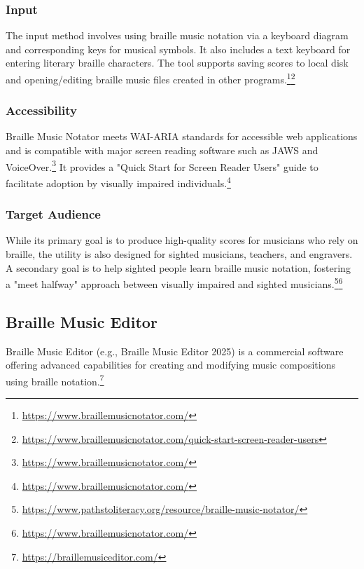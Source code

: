 \subsubsection{Input}
The input method involves using braille music notation via a keyboard diagram and corresponding keys for musical symbols. It also includes a text keyboard for entering literary braille characters. The tool supports saving scores to local disk and opening/editing braille music files created in other programs.\footnote{\url{https://www.braillemusicnotator.com/}}\footnote{\url{https://www.braillemusicnotator.com/quick-start-screen-reader-users}}

\subsubsection{Accessibility}
Braille Music Notator meets WAI-ARIA standards for accessible web applications and is compatible with major screen reading software such as JAWS and VoiceOver.\footnote{\url{https://www.braillemusicnotator.com/}} It provides a "Quick Start for Screen Reader Users" guide to facilitate adoption by visually impaired individuals.\footnote{\url{https://www.braillemusicnotator.com/}}

\subsubsection{Target Audience}
While its primary goal is to produce high-quality scores for musicians who rely on braille, the utility is also designed for sighted musicians, teachers, and engravers. A secondary goal is to help sighted people learn braille music notation, fostering a "meet halfway" approach between visually impaired and sighted musicians.\footnote{\url{https://www.pathstoliteracy.org/resource/braille-music-notator/}}\footnote{\url{https://www.braillemusicnotator.com/}}

\subsection{Braille Music Editor}
Braille Music Editor (e.g., Braille Music Editor 2025) is a commercial software offering advanced capabilities for creating and modifying music compositions using braille notation.\footnote{\url{https://braillemusiceditor.com/}}


